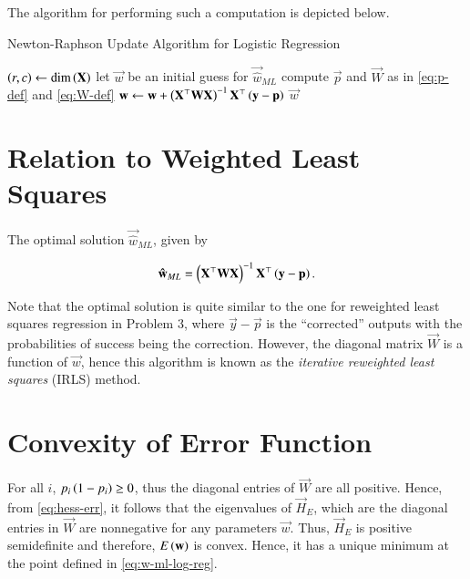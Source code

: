 \documentclass[journal,12pt,twocolumn]{IEEEtran}
\begin{document}
The algorithm for performing such a computation is depicted below.

\begin{algorithm}
     \caption{Newton-Raphson Update Algorithm for Logistic Regression}\label{alg:nr-log-reg}
     \begin{algorithmic}[1]
          \State \(\left(r,c\right) \gets \mathrm{dim}\left(\boldsymbol{\mathbf{X}}\right)\)
          \State let \(\vec{w}\) be an initial guess for \(\vec{\hat{w}}_{ML}\)
          \Repeat
               \State compute \(\vec{p}\) and \(\vec{W}\) as in \eqref{eq:p-def} and \eqref{eq:W-def}
               \State \(\boldsymbol{\mathbf{w}} \gets \boldsymbol{\mathbf{w}} + \left(\boldsymbol{\mathbf{X}}^\top\boldsymbol{\mathbf{WX}}\right)^{-1}\boldsymbol{\mathbf{X}}^\top\left(\boldsymbol{\mathbf{y}}-\boldsymbol{\mathbf{p}}\right)\)
          \EndFunction
          \Return \(\vec{w}\)
     \end{algorithmic}
\end{algorithm}

\section{Relation to Weighted Least Squares}

The optimal solution \(\vec{\hat{w}}_{ML}\), given by

\begin{equation}
     \boldsymbol{\mathbf{\hat{w}}}_{ML} = \left(\boldsymbol{\mathbf{X}}^\top\boldsymbol{\mathbf{WX}}\right)^{-1}\boldsymbol{\mathbf{X}}^\top\left(\boldsymbol{\mathbf{y}}-\boldsymbol{\mathbf{p}}\right).
     \label{eq:w-ml-log-reg}
\end{equation}

Note that the optimal solution is quite similar to the one for reweighted least
squares regression in Problem 3, where \(\vec{y}-\vec{p}\) is the ``corrected''
outputs with the probabilities of success being the correction. However, the
diagonal matrix \(\vec{W}\) is a function of \(\vec{w}\), hence this algorithm
is known as the \emph{iterative reweighted least squares} (IRLS) method.

\section{Convexity of Error Function}

For all \(i\), \(p_i\left(1-p_i\right) \ge 0\), thus the diagonal entries of
\(\vec{W}\) are all positive. Hence, from \eqref{eq:hess-err}, it follows that
the eigenvalues of \(\vec{H}_E\), which are the diagonal entries in \(\vec{W}\)
are nonnegative for any parameters \(\vec{w}\). Thus, \(\vec{H}_E\) is positive
semidefinite and therefore, \(E\left(\boldsymbol{\mathbf{w}}\right)\) is convex. Hence, it has a
unique minimum at the point defined in \eqref{eq:w-ml-log-reg}.
\end{document}
